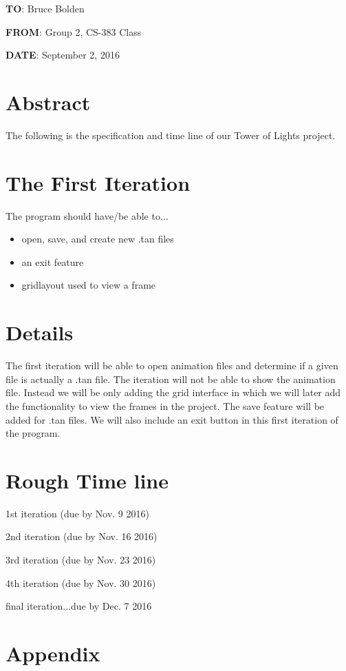 \documentclass[12pt]{article}
\begin{document}
\noindent \textbf{TO}: Bruce Bolden\par 
\noindent
\textbf{FROM}: Group 2, CS-383 Class\par 
\noindent
\textbf{DATE}: September 2, 2016\par 
\noindent
\section*{Abstract}
The following is the specification and time line of our Tower of Lights project.
\section*{The First Iteration}
The program should have/be able to...\begin{itemize}
\item{open, save, and create new .tan files}
\item{an exit feature}
\item{gridlayout used to view a frame}
\end{itemize}
\section*{Details}
The first iteration will be able to open animation files and determine if a given file is actually a .tan file. The iteration will not be able to show the animation file. Instead we will be only adding the grid interface in which we will later add the functionality to view the frames in the project. The save feature will be added for .tan files. We will also include an exit button in this first iteration of the program. 
\section*{Rough  Time line}
1st iteration (due by Nov. 9 2016)\par 
\noindent
2nd iteration (due by Nov. 16 2016)\par 
\noindent
3rd iteration (due by Nov. 23 2016)\par 
\noindent
4th iteration (due by Nov. 30 2016)\par 
\noindent
final iteration...due by Dec. 7 2016\par 
\noindent
\pagebreak
\noindent
\section*{Appendix}
\end{document}
